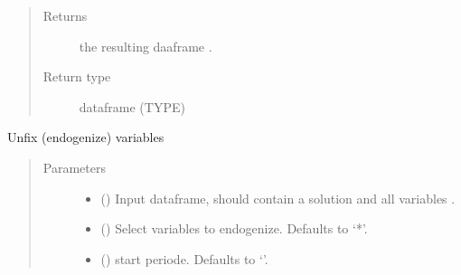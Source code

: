\documentclass[letterpaper,10pt,english]{sphinxmanual}
\begin{document}
\begin{fulllineitems}
\begin{fulllineitems}
\begin{quote}
\begin{description}
\begin{itemize}
\end{itemize}

\item[{Returns}] \leavevmode
\sphinxAtStartPar
the resulting daaframe .

\item[{Return type}] \leavevmode
\sphinxAtStartPar
dataframe (TYPE)

\end{description}\end{quote}

\end{fulllineitems}


\begin{fulllineitems}
\label{\detokenize{core/modelclass:modelclass.WB_Mixin.unfix}}
\pysigstartsignatures
{}
\pysigstopsignatures
\sphinxAtStartPar
Unfix (endogenize) variables
\begin{quote}\begin{description}
\item[{Parameters}] \leavevmode\begin{itemize}
\item {} 
\sphinxAtStartPar
{} () \textendash{} Input dataframe, should contain a solution and all variables .

\item {} 
\sphinxAtStartPar
{} (\sphinxstyleliteralemphasis{\sphinxupquote{, }}) \textendash{} Select variables to endogenize. Defaults to ‘*’.

\item {} 
\sphinxAtStartPar
{} (\sphinxstyleliteralemphasis{\sphinxupquote{, }}) \textendash{} start periode. Defaults to ‘’.


\end{itemize}
\end{description}
\end{quote}
\end{fulllineitems}
\end{fulllineitems}
\end{document}
